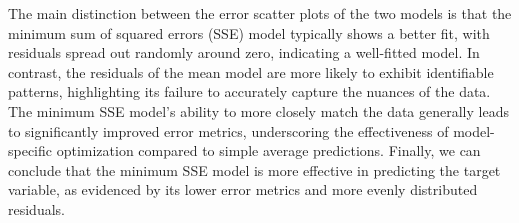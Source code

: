 The main distinction between the error scatter plots of the two models is that the minimum sum of squared errors (SSE) model typically shows a better fit, with residuals spread out randomly around zero, indicating a well-fitted model. In contrast, the residuals of the mean model are more likely to exhibit identifiable patterns, highlighting its failure to accurately capture the nuances of the data. The minimum SSE model's ability to more closely match the data generally leads to significantly improved error metrics, underscoring the effectiveness of model-specific optimization compared to simple average predictions. Finally, we can conclude that the minimum SSE model is more effective in predicting the target variable, as evidenced by its lower error metrics and more evenly distributed residuals.


